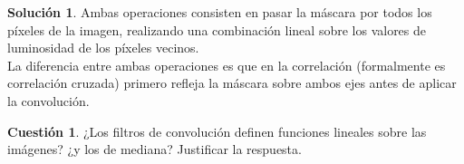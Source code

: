 \documentclass[a4paper, 11pt]{article}
\theoremstyle{definition}
\newtheorem{cuestion}{Cuestión}
\newtheorem*{solucion}{Solución}
\begin{document}
  \begin{solucion}
      Ambas operaciones consisten en pasar la máscara por todos los píxeles de la imagen,
      realizando una combinación lineal sobre los valores de luminosidad de los píxeles vecinos. \\

      La diferencia entre ambas operaciones es que en la correlación (formalmente
      es correlación cruzada) primero refleja la máscara sobre ambos ejes antes de
      aplicar la convolución.
  \end{solucion}

  \begin{cuestion}
      ¿Los filtros de convolución definen funciones lineales sobre las
      imágenes? ¿y los de mediana? Justificar la respuesta.
  \end{cuestion}
\end{document}
